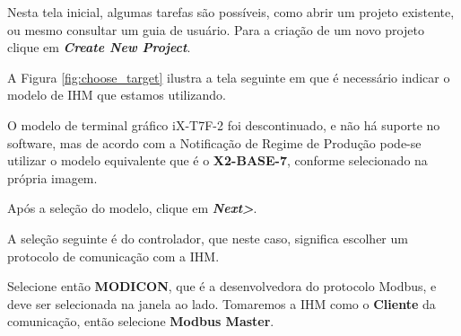 Nesta tela inicial, algumas tarefas são possíveis, 
como abrir um projeto existente, 
ou mesmo consultar um guia de usuário. 
Para a criação de um novo projeto clique em 
\textit{\textbf{Create New Project}}.


A Figura \ref{fig:choose_target} 
ilustra a tela seguinte em que é necessário indicar o modelo de IHM que estamos utilizando. 


\begin{figure}[ht!]
	\centering
\end{figure}


O modelo de terminal gráfico iX-T7F-2 foi descontinuado, 
e não há suporte no software, 
mas de acordo com a Notificação de Regime de Produção 
\cite{ix_t7f_2-x2_base_7} 
pode-se utilizar o modelo equivalente que é o 
\textbf{X2-BASE-7}, conforme selecionado na própria imagem.

Após a seleção do modelo, clique em \textbf{\textit{Next>}}.

A seleção seguinte é do controlador, que neste caso, 
significa escolher um protocolo de comunicação com a IHM. 

Selecione então \textbf{MODICON}, 
que é a desenvolvedora do protocolo Modbus, 
e deve ser selecionada na janela ao lado. 
Tomaremos a IHM como o \textbf{Cliente} da comunicação, 
então selecione \textbf{Modbus Master}.  



\begin{figure}[ht!]
	\centering
\end{figure}


